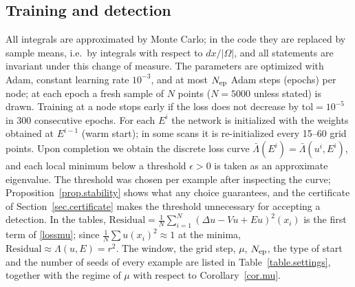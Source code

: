 \documentclass[10pt]{amsart}
\theoremstyle{definition}
\theoremstyle{remark}
\theoremstyle{plain}
\begin{document}
\subsection{Training and detection}
All integrals are approximated by Monte Carlo; in the code they are replaced by sample means, i.e.\ by
integrals with respect to $dx/|\Omega|$, and all statements are invariant under this change of measure.
The parameters are optimized with Adam, constant learning rate $10^{-3}$, and at most $N_{\rm ep}$ Adam
steps (epochs) per node; at each epoch a fresh sample of $N$ points ($N=5000$ unless stated) is drawn.
Training at a node stops early if the loss does not decrease by $\mathrm{tol}=10^{-5}$ in 300
consecutive epochs. For each $E^i$ the network is initialized with the weights obtained at $E^{i-1}$
(warm start); in some scans it is re-initialized every 15--60 grid points. Upon completion we obtain
the discrete loss curve $\bar \Lambda(E^i)=\bar\Lambda(u^i, E^i)$, and each local minimum below a threshold
$\epsilon>0$ is taken as an approximate eigenvalue. The threshold was chosen per example after
inspecting the curve; Proposition~\ref{prop.stability} shows what any choice guarantees, and the
certificate of Section~\ref{sec.certificate} makes the threshold unnecessary for accepting a detection.
In the tables, $\mathrm{Residual}=\frac1N\sum_{i=1}^N(\Delta u-Vu+Eu)^2(x_i)$ is the first term of
\eqref{lossmu}; since $\frac1N\sum u(x_i)^2\approx1$ at the minima, $\mathrm{Residual}\approx\Lambda(u,E)=r^2$.
The window, the grid step, $\mu$, $N_{\rm ep}$, the type of start and the number of seeds of every
example are listed in Table~\ref{table.settings}, together with the regime of $\mu$ with respect to
Corollary~\ref{cor.mu}.
\end{document}
